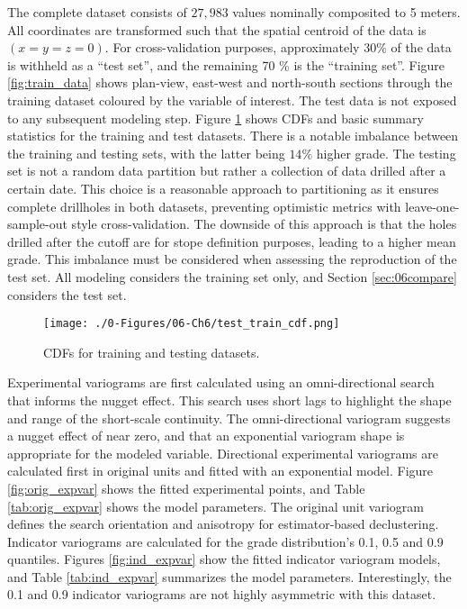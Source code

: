 The complete dataset consists of $27,983$ values nominally composited to 5 meters. All coordinates are transformed such that the spatial centroid of the data is $(x=y=z=0)$. For cross-validation purposes, approximately 30\% of the data is withheld as a ``test set'', and the remaining 70 \% is the ``training set''. Figure \ref{fig:train_data} shows plan-view, east-west and north-south sections through the training dataset coloured by the variable of interest. The test data is not exposed to any subsequent modeling step. Figure \ref{fig:datasets} shows \glspl{CDF} and basic summary statistics for the training and test datasets. There is a notable imbalance between the training and testing sets, with the latter being $14\%$ higher grade. The testing set is not a random data partition but rather a collection of data drilled after a certain date. This choice is a reasonable approach to partitioning as it ensures complete drillholes in both datasets, preventing optimistic metrics with leave-one-sample-out style cross-validation. The downside of this approach is that the holes drilled after the cutoff are for stope definition purposes, leading to a higher mean grade. This imbalance must be considered when assessing the reproduction of the test set. All modeling considers the training set only, and Section \ref{sec:06compare} considers the test set.

\begin{figure}[htb!]
    \centering
    \texttt{[image: ./0-Figures/06-Ch6/test\_train\_cdf.png]}
    \caption{ \Glspl{CDF} for training and testing datasets. }
    \label{fig:datasets}
\end{figure}

Experimental variograms are first calculated using an omni-directional search that informs the nugget effect. This search uses short lags to highlight the shape and range of the short-scale continuity. The omni-directional variogram suggests a nugget effect of near zero, and that an exponential variogram shape is appropriate for the modeled variable. Directional experimental variograms are calculated first in original units and fitted with an exponential model. Figure \ref{fig:orig_expvar} shows the fitted experimental points, and Table \ref{tab:orig_expvar} shows the model parameters. The original unit variogram defines the search orientation and anisotropy for estimator-based declustering. Indicator variograms are calculated for the grade distribution's 0.1, 0.5 and 0.9 quantiles. Figures \ref{fig:ind_expvar} show the fitted indicator variogram models, and Table \ref{tab:ind_expvar} summarizes the model parameters. Interestingly, the 0.1 and 0.9 indicator variograms are not highly asymmetric with this dataset.

